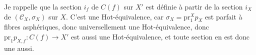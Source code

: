 \documentclass[11pt]{article}
\begin{document}
Je rappelle que la section $i_f$ de $C(f)$ sur $X'$ est définie à partir de la section $i_X$ de $(\mathcal{C}_X,\sigma_X)$ sur $X$. C'est une Hot-équivalence, car $\sigma_X = \mathrm{pr}_1^X p_X$ est parfait à fibres asphériques, donc universellement une Hot-équivalence, donc $\mathrm{pr}_1 p_{X,f} : C(f) \longrightarrow X'$ est aussi une Hot-équivalence, et toute section en est donc une aussi.
\end{document}
